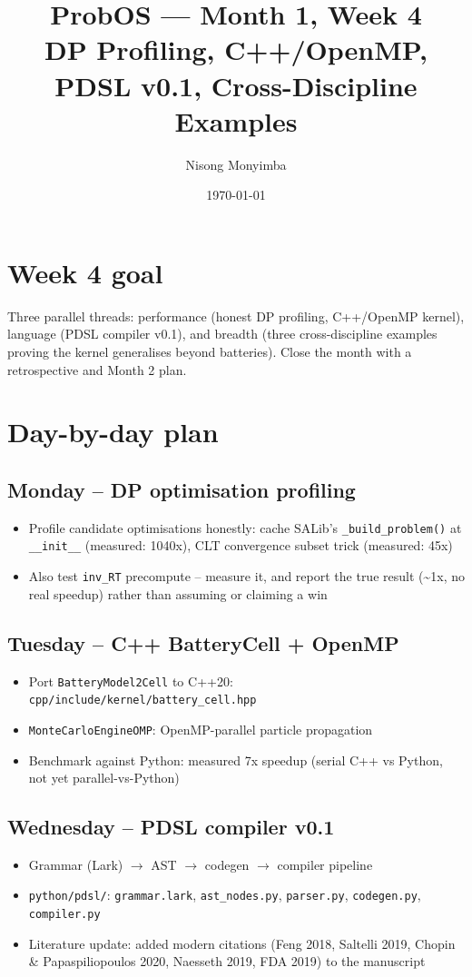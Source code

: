 \documentclass[11pt]{article}
\title{ProbOS --- Month 1, Week 4\\DP Profiling, C++/OpenMP, PDSL v0.1, Cross-Discipline Examples}
\author{Nisong Monyimba}
\date{\today}
\begin{document}
\maketitle

\section*{Week 4 goal}
Three parallel threads: performance (honest DP profiling, C++/OpenMP
kernel), language (PDSL compiler v0.1), and breadth (three
cross-discipline examples proving the kernel generalises beyond
batteries). Close the month with a retrospective and Month 2 plan.

\section*{Day-by-day plan}

\subsection*{Monday -- DP optimisation profiling}
\begin{itemize}[leftmargin=*]
  \item Profile candidate optimisations honestly: cache SALib's
    \texttt{\_build\_problem()} at \texttt{\_\_init\_\_} (measured:
    1040x), CLT convergence subset trick (measured: 45x)
  \item Also test \texttt{inv\_RT} precompute -- measure it, and report
    the true result (\textasciitilde{}1x, no real speedup) rather than
    assuming or claiming a win
\end{itemize}

\subsection*{Tuesday -- C++ BatteryCell + OpenMP}
\begin{itemize}[leftmargin=*]
  \item Port \texttt{BatteryModel2Cell} to C++20:
    \texttt{cpp/include/kernel/battery\_cell.hpp}
  \item \texttt{MonteCarloEngineOMP}: OpenMP-parallel particle
    propagation
  \item Benchmark against Python: measured 7x speedup (serial C++ vs
    Python, not yet parallel-vs-Python)
\end{itemize}

\subsection*{Wednesday -- PDSL compiler v0.1}
\begin{itemize}[leftmargin=*]
  \item Grammar (Lark) $\to$ AST $\to$ codegen $\to$ compiler pipeline
  \item \texttt{python/pdsl/}: \texttt{grammar.lark},
    \texttt{ast\_nodes.py}, \texttt{parser.py}, \texttt{codegen.py},
    \texttt{compiler.py}
  \item Literature update: added modern citations (Feng 2018, Saltelli
    2019, Chopin \& Papaspiliopoulos 2020, Naesseth 2019, FDA 2019) to
    the manuscript
\end{itemize}
\end{document}

